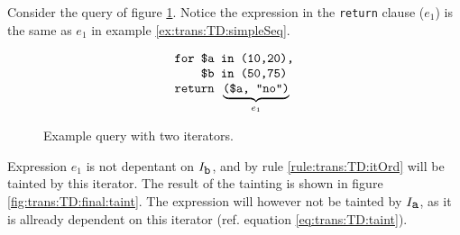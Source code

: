 \begin{myExample}
Consider the query of figure \ref{fig:trans:TD:dblFor}. Notice the expression in the \texttt{return} clause ($e_1$)
is the same as $e_1$ in example \ref{ex:trans:TD:simpleSeq}.

\begin{figure}[h]
\begin{equation*}
\begin{array}{l}
\mbox{\texttt{for \$a in (10,20),}} \\
\mbox{\texttt{\phantom{abcd}\$b in (50,75)}} \\ 
\mbox{\texttt{return }}\underbrace{\mbox{\texttt{(\$a, "no")}} }_{e_{1}}
\end{array}
\end{equation*}
\caption{Example query with two iterators.}
\label{fig:trans:TD:dblFor}
\end{figure}

Expression $e_{1}$ is not depentant on $I_{\mbox{\texttt{b}}}$, and by rule \ref{rule:trans:TD:itOrd} will be
tainted by this iterator. The result of the tainting is shown in figure \ref{fig:trans:TD:final:taint}. The
expression will however not be tainted by $I_{\mbox{\texttt{a}}}$, as it is allready dependent on this iterator
(ref. equation \ref{eq:trans:TD:taint}).


\end{myExample}
